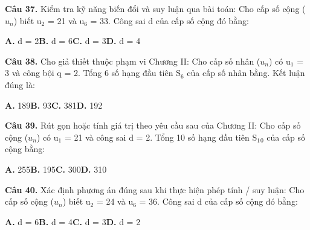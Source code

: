 \documentclass[11pt,a4paper]{article}
\begin{document}
\textbf{\color{primary} Câu 37.} Kiểm tra kỹ năng biến đổi và suy luận qua bài toán: Cho cấp số cộng ($u_n$) biết u$_2$ = 21 và u$_6$ = 33. Công sai d của cấp số cộng đó bằng:\par
\hspace*{1.5em}\textbf{A.} d = 2\quad\quad \textbf{B.} d = 6\quad\quad \textbf{C.} d = 3\quad\quad \textbf{D.} d = 4\par\vspace{2pt}
\textbf{\color{primary} Câu 38.} Cho giả thiết thuộc phạm vi Chương II: Cho cấp số nhân ($u_n$) có u$_1$ = 3 và công bội q = 2. Tổng 6 số hạng đầu tiên S$_6$ của cấp số nhân bằng. Kết luận đúng là:\par
\hspace*{1.5em}\textbf{A.} 189\quad\quad \textbf{B.} 93\quad\quad \textbf{C.} 381\quad\quad \textbf{D.} 192\par\vspace{2pt}
\textbf{\color{primary} Câu 39.} Rút gọn hoặc tính giá trị theo yêu cầu sau của Chương II: Cho cấp số cộng ($u_n$) có u$_1$ = 21 và công sai d = 2. Tổng 10 số hạng đầu tiên S$_1$$_0$ của cấp số cộng bằng:\par
\hspace*{1.5em}\textbf{A.} 255\quad\quad \textbf{B.} 195\quad\quad \textbf{C.} 300\quad\quad \textbf{D.} 310\par\vspace{2pt}
\textbf{\color{primary} Câu 40.} Xác định phương án đúng sau khi thực hiện phép tính / suy luận: Cho cấp số cộng ($u_n$) biết u$_2$ = 24 và u$_6$ = 36. Công sai d của cấp số cộng đó bằng:\par
\hspace*{1.5em}\textbf{A.} d = 6\quad\quad \textbf{B.} d = 4\quad\quad \textbf{C.} d = 3\quad\quad \textbf{D.} d = 2\par\vspace{2pt}
\end{document}
